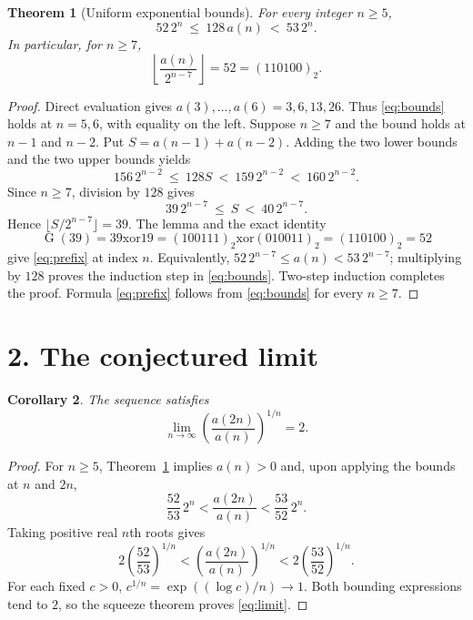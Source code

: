 \documentclass[11pt]{article}
\newtheorem{theorem}{Theorem}
\newtheorem{corollary}[theorem]{Corollary}
\newcommand{\G}{\operatorname{G}}
\newcommand{\xor}{\mathbin{\mathrm{xor}}}
\begin{document}
\begin{theorem}[Uniform exponential bounds]\label{thm:bounds}
For every integer $n\ge5$,
\begin{equation}\label{eq:bounds}
 52\,2^n\ \le\ 128\,a(n)\ <\ 53\,2^n.
\end{equation}
In particular, for $n\ge7$,
\begin{equation}\label{eq:prefix}
 \left\lfloor\frac{a(n)}{2^{n-7}}\right\rfloor=52=(110100)_2.
\end{equation}
\end{theorem}
\begin{proof}
Direct evaluation gives $a(3),\ldots,a(6)=3,6,13,26$. Thus \eqref{eq:bounds} holds at $n=5,6$, with equality on the left. Suppose $n\ge7$ and the bound holds at $n-1$ and $n-2$. Put $S=a(n-1)+a(n-2)$. Adding the two lower bounds and the two upper bounds yields
\[
 156\,2^{n-2}\ \le\ 128S\ <\ 159\,2^{n-2}\ <\ 160\,2^{n-2}.
\]
Since $n\ge7$, division by $128$ gives
\[
 39\,2^{n-7}\ \le\ S\ <\ 40\,2^{n-7}.
\]
Hence $\lfloor S/2^{n-7}\rfloor=39$. The lemma and the exact identity
\[
 \G(39)=39\xor19=(100111)_2\xor(010011)_2=(110100)_2=52
\]
give \eqref{eq:prefix} at index $n$. Equivalently,
$52\,2^{n-7}\le a(n)<53\,2^{n-7}$; multiplying by $128$ proves the induction step in \eqref{eq:bounds}. Two-step induction completes the proof. Formula \eqref{eq:prefix} follows from \eqref{eq:bounds} for every $n\ge7$.
\end{proof}

\section*{2. The conjectured limit}
\begin{corollary}\label{cor:limit}
The sequence satisfies
\begin{equation}\label{eq:limit}
 \boxed{\displaystyle\lim_{n\to\infty}
       \left(\frac{a(2n)}{a(n)}\right)^{1/n}=2.}
\end{equation}
\end{corollary}
\begin{proof}
For $n\ge5$, Theorem~\ref{thm:bounds} implies $a(n)>0$ and, upon applying the bounds at $n$ and $2n$,
\begin{equation}\label{eq:ratio}
 \frac{52}{53}\,2^n
 <\frac{a(2n)}{a(n)}
 <\frac{53}{52}\,2^n.
\end{equation}
Taking positive real $n$th roots gives
\[
 2\left(\frac{52}{53}\right)^{1/n}
 <\left(\frac{a(2n)}{a(n)}\right)^{1/n}
 <2\left(\frac{53}{52}\right)^{1/n}.
\]
For each fixed $c>0$, $c^{1/n}=\exp((\log c)/n)\to1$. Both bounding expressions tend to $2$, so the squeeze theorem proves \eqref{eq:limit}.
\end{proof}
\end{document}
